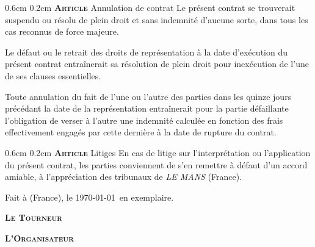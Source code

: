 \documentclass[a4paper,10pt]{article}
\makeatletter
\newcommand{\PR}{\textbf{\textsc{Le Tourneur}}}
\newcommand{\OR}{\textbf{\textsc{L'Organisateur}}}
\renewcommand\section{\@startsection{section}{1}{\z@}%
	{0.6cm}%
	{0.2cm}%
	{\noindent\large\bfseries\scshape Article }}
\renewcommand\subsection{\@startsection{subsection}{2}{1em}%
	{0.24cm}%
	{-0.5cm}%
	{\bfseries\scshape}}
\renewcommand\thesubsection{\thesection.\Roman{subsection})}
\makeatother
\begin{document}
\section{Annulation de contrat}
\label{sec:annulation}
Le pr\'esent contrat se trouverait suspendu ou r\'esolu de plein droit et
sans indemnit\'e d'aucune sorte, dans tous les cas reconnus de force
majeure.

Le d\'efaut ou le retrait des droits de repr\'esentation \`a la date
d'ex\'ecution du pr\'esent contrat entra\^inerait sa r\'esolution de plein
droit pour inex\'ecution de l'une de ses clauses essentielles.

Toute annulation du fait de l'une ou l'autre des parties dans les
quinze jours pr\'ec\'edant la date de la repr\'esentation entra\^inerait pour
la partie d\'efaillante l'obligation de verser \`a l'autre une indemnit\'e
calcul\'ee en fonction des frais effectivement engag\'es par cette
derni\`ere \`a la date de rupture du contrat.

\section{Litiges}
\label{sec:litiges}
En cas de litige sur l'interpr\'etation ou l'application du pr\'esent
contrat, les parties conviennent de s'en remettre \`a d\'efaut d'un accord
amiable, \`a l'appr\'eciation des tribunaux de \emph{LE MANS} (France).

\vfill
Fait \`a \VILLEAMMD{} (France), le \today\ en \NBEX{} exemplaire.

\begin{minipage}[h!]{0.5\linewidth}
  \begin{center}
    \PR
  \end{center}
\end{minipage}
\begin{minipage}[h!]{0.5\linewidth}
  \begin{center}
    \OR
  \end{center}
\end{minipage}
\vspace{6cm}

\newpage
\appendix
\makeatletter
\renewcommand\section{\@startsection{section}{1}{\z@}%
	{1cm}%
	{0.2cm}%
	{\noindent\large\bfseries\scshape Annexe }}
\renewcommand\subsection{\@startsection{subsection}{2}{0.2em}%
	{0.24cm}%
	{0.1cm}%
	{\large\bfseries\scshape}}
\renewcommand\subsubsection{\@startsection{subsubsection}{3}{1em}%
	{0.24cm}%
	{-0.5cm}%
	{\bfseries\scshape}}
\makeatother
\renewcommand\thesubsection{\arabic{subsection}}
\end{document}
